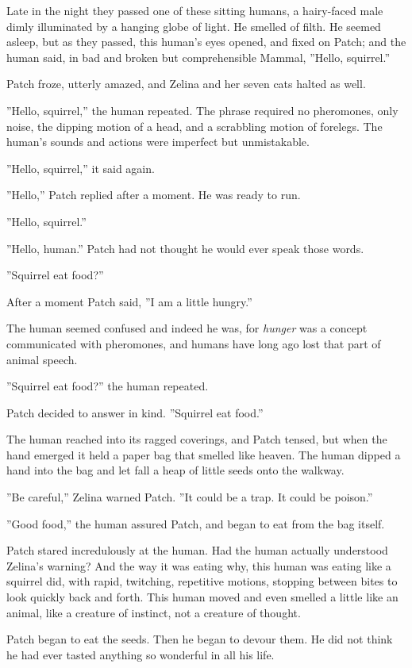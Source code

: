 \documentclass[12pt]{book}
\begin{document}
Late in the night they passed one of these sitting humans, a hairy-faced male dimly illuminated by a hanging globe of light. He smelled of filth. He seemed asleep, but as they passed, this human's eyes opened, and fixed on Patch; and the human said, in bad and broken but comprehensible Mammal, ''Hello, squirrel.''

Patch froze, utterly amazed, and Zelina and her seven cats halted as well.

''Hello, squirrel,'' the human repeated. The phrase required no pheromones, only noise, the dipping motion of a head, and a scrabbling motion of forelegs. The human's sounds and actions were imperfect but unmistakable.

''Hello, squirrel,'' it said again.

''Hello,'' Patch replied after a moment. He was ready to run.

''Hello, squirrel.''

''Hello, human.'' Patch had not thought he would ever speak those words.

''Squirrel eat food?''

After a moment Patch said, ''I am a little hungry.''

The human seemed confused %
and indeed he was, for {\it hunger} was a concept communicated with pheromones, and humans have long ago lost that part of animal speech.

''Squirrel eat food?'' the human repeated.

Patch decided to answer in kind. ''Squirrel eat food.''

The human reached into its ragged coverings, and Patch tensed, but when the hand emerged it held a paper bag that smelled like heaven. The human dipped a hand into the bag and let fall a heap of little seeds onto the walkway.

''Be careful,'' Zelina warned Patch. ''It could be a trap. It could be poison.''

''Good food,'' the human assured Patch, and began to eat from the bag itself.

Patch stared incredulously at the human. Had the human actually understood Zelina's warning? And the way it was eating %
why, this human was eating like a squirrel did, with rapid, twitching, repetitive motions, stopping between bites to look quickly back and forth. This human moved and even smelled a little like an animal, like a creature of instinct, not a creature of thought.

Patch began to eat the seeds. Then he began to devour them. He did not think he had ever tasted anything so wonderful in all his life.
\end{document}
